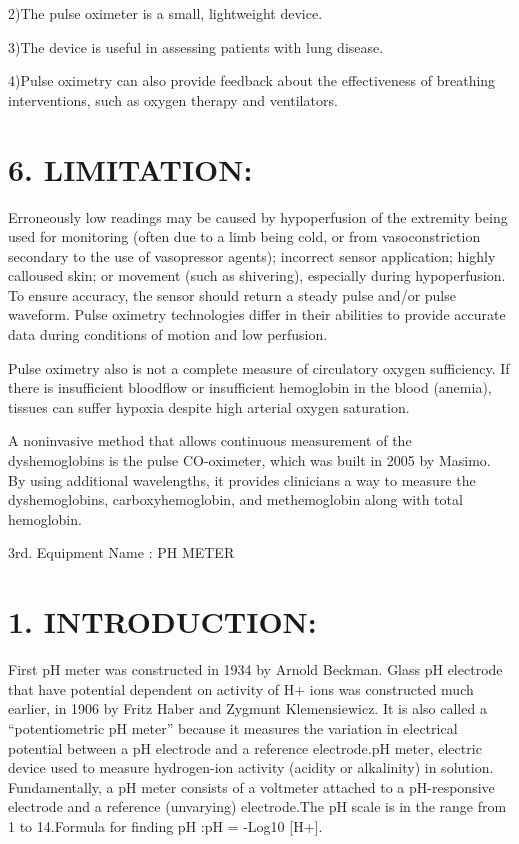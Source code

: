 \documentclass[12pt]{article}
\begin{document}
   2)The pulse oximeter is a small, lightweight device.
   
    3)The device is useful in assessing patients with lung disease.
    
    4)Pulse oximetry can also provide feedback about the effectiveness of breathing interventions, such as oxygen therapy and ventilators.
    
\section*{6.  LIMITATION:}
  

 Erroneously low readings may be caused by hypoperfusion of the extremity being used for monitoring (often due to a limb being cold, or from vasoconstriction secondary to the use of vasopressor agents); incorrect sensor application; highly calloused skin; or movement (such as shivering), especially during hypoperfusion. To ensure accuracy, the sensor should return a steady pulse and/or pulse waveform. Pulse oximetry technologies differ in their abilities to provide accurate data during conditions of motion and low perfusion.          
  
 Pulse oximetry also is not a complete measure of circulatory oxygen sufficiency. If there is insufficient bloodflow or insufficient hemoglobin in the blood (anemia), tissues can suffer hypoxia despite high arterial oxygen saturation.
 
 A noninvasive method that allows continuous measurement of the dyshemoglobins is the pulse CO-oximeter, which was built in 2005 by Masimo. By using additional wavelengths, it provides clinicians a way to measure the dyshemoglobins, carboxyhemoglobin, and methemoglobin along with total hemoglobin.
 
 
\maketitle 
\clearpage
3rd. Equipment Name : PH METER

\section*{1. INTRODUCTION:}
  First pH meter was constructed in 1934 by Arnold Beckman. Glass pH electrode that have potential dependent on activity of H+ ions was constructed much earlier, in 1906 by Fritz Haber and Zygmunt Klemensiewicz. It is also called a “potentiometric pH meter” because it measures the variation in electrical potential between a pH electrode and a reference electrode.pH meter,  electric device used to measure hydrogen-ion activity (acidity or alkalinity) in solution. Fundamentally, a pH meter consists of a voltmeter attached to a pH-responsive electrode and a reference (unvarying) electrode.The pH scale is in the range from 1 to 14.Formula for finding pH :pH = -Log10 [H+].
\end{document}
